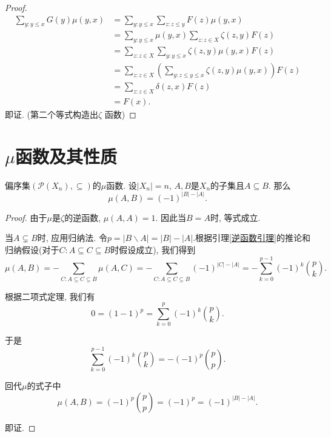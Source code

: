 \begin{proof}
    \begin{align*}
        \sum_{y : y \leq x} G(y) \mu(y, x) & = \sum_{y : y \leq x} \sum_{z : z \leq y} F(z) \mu(y, x)                                  \\
                                           & = \sum_{y : y \leq x} \mu(y, x) \sum_{z : z \in X} \zeta(z, y) F(z)                       \\
                                           & = \sum_{z : z \in X} \sum_{y : y \leq x} \zeta(z, y) \mu(y, x) F(z)                       \\
                                           & = \sum_{z : z \in X} \left( \sum_{y : z \leq y \leq x} \zeta(z, y) \mu(y, x) \right) F(z) \\
                                           & = \sum_{z : z \in X} \delta(z, x) F(z)                                                    \\
                                           & = F(x).
    \end{align*}
    即证. (第二个等式构造出\(\zeta\) 函数)
\end{proof}

\section{\(\mu\)函数及其性质}
\begin{corollary}\label{umumu1}
    偏序集\((\mathcal{P}(X_n),\subseteq) \)的\(\mu\)函数. 设\(|X_n|=n\), $A,B$是\(X_n\)的子集且\(A\subseteq B\). 那么\[\mu(A,B)=(-1)^{|B|-|A|}.\]
\end{corollary}
\begin{proof}
    由于\(\mu\)是\(\zeta\)的逆函数, \(\mu(A,A)=1\). 因此当\(B=A\)时, 等式成立.

    当\(A\subsetneq B\)时, 应用归纳法. 令\(p=|B\backslash A|=|B|-|A|.\)根据引理\ref{逆函数引理}的推论和归纳假设(对于\(C: A \subseteq C \subseteq B\)时假设成立), 我们得到
    \[\mu(A,B) = -\sum_{C: A \subseteq C \subseteq B} \mu(A,C) = - \sum_{C: A \subseteq C \subseteq B} (-1)^{|C|-|A|} = - \sum_{k=0}^{p-1} (-1)^k \binom{p}{k}.\]

    根据二项式定理, 我们有
    \[0 = (1 - 1)^p = \sum_{k=0}^{p} (-1)^k \binom{p}{k}.\]

    于是
    \[\sum_{k=0}^{p-1} (-1)^k \binom{p}{k} = -(-1)^p \binom{p}{p}.\]

    回代\(\mu\)的式子中
    \[\mu(A,B) = (-1)^p \binom{p}{p} = (-1)^p = (-1)^{|B|-|A|}.\]

    即证.
\end{proof}

